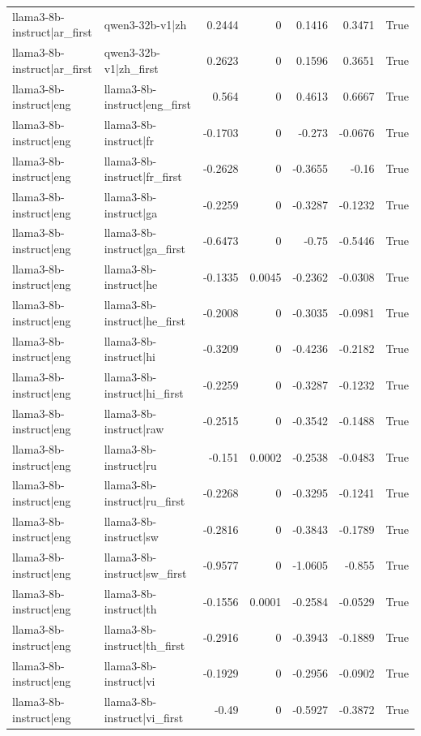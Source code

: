\begin{table}
\begin{tabular}{l l r r r r l}
llama3-8b-instruct|ar_first & qwen3-32b-v1|zh & 0.2444 & 0 & 0.1416 & 0.3471 & True \\
llama3-8b-instruct|ar_first & qwen3-32b-v1|zh_first & 0.2623 & 0 & 0.1596 & 0.3651 & True \\
llama3-8b-instruct|eng & llama3-8b-instruct|eng_first & 0.564 & 0 & 0.4613 & 0.6667 & True \\
llama3-8b-instruct|eng & llama3-8b-instruct|fr & -0.1703 & 0 & -0.273 & -0.0676 & True \\
llama3-8b-instruct|eng & llama3-8b-instruct|fr_first & -0.2628 & 0 & -0.3655 & -0.16 & True \\
llama3-8b-instruct|eng & llama3-8b-instruct|ga & -0.2259 & 0 & -0.3287 & -0.1232 & True \\
llama3-8b-instruct|eng & llama3-8b-instruct|ga_first & -0.6473 & 0 & -0.75 & -0.5446 & True \\
llama3-8b-instruct|eng & llama3-8b-instruct|he & -0.1335 & 0.0045 & -0.2362 & -0.0308 & True \\
llama3-8b-instruct|eng & llama3-8b-instruct|he_first & -0.2008 & 0 & -0.3035 & -0.0981 & True \\
llama3-8b-instruct|eng & llama3-8b-instruct|hi & -0.3209 & 0 & -0.4236 & -0.2182 & True \\
llama3-8b-instruct|eng & llama3-8b-instruct|hi_first & -0.2259 & 0 & -0.3287 & -0.1232 & True \\
llama3-8b-instruct|eng & llama3-8b-instruct|raw & -0.2515 & 0 & -0.3542 & -0.1488 & True \\
llama3-8b-instruct|eng & llama3-8b-instruct|ru & -0.151 & 0.0002 & -0.2538 & -0.0483 & True \\
llama3-8b-instruct|eng & llama3-8b-instruct|ru_first & -0.2268 & 0 & -0.3295 & -0.1241 & True \\
llama3-8b-instruct|eng & llama3-8b-instruct|sw & -0.2816 & 0 & -0.3843 & -0.1789 & True \\
llama3-8b-instruct|eng & llama3-8b-instruct|sw_first & -0.9577 & 0 & -1.0605 & -0.855 & True \\
llama3-8b-instruct|eng & llama3-8b-instruct|th & -0.1556 & 0.0001 & -0.2584 & -0.0529 & True \\
llama3-8b-instruct|eng & llama3-8b-instruct|th_first & -0.2916 & 0 & -0.3943 & -0.1889 & True \\
llama3-8b-instruct|eng & llama3-8b-instruct|vi & -0.1929 & 0 & -0.2956 & -0.0902 & True \\
llama3-8b-instruct|eng & llama3-8b-instruct|vi_first & -0.49 & 0 & -0.5927 & -0.3872 & True \\

\end{tabular}
\end{table}
